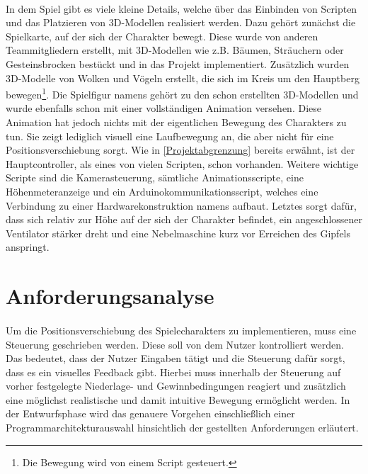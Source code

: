 \paragraph{}
In dem Spiel gibt es viele kleine Details, welche über das Einbinden von Scripten und das Platzieren von 3D-Modellen realisiert werden. Dazu gehört zunächst die Spielkarte, auf der sich der Charakter bewegt. Diese wurde von anderen Teammitgliedern erstellt, mit 3D-Modellen wie z.B. Bäumen, Sträuchern oder Gesteinsbrocken bestückt und in das Projekt implementiert. Zusätzlich wurden 3D-Modelle von Wolken und Vögeln erstellt, die sich im Kreis um den Hauptberg bewegen\footnote{Die Bewegung wird von einem Script gesteuert.}.
Die Spielfigur namens  gehört zu den schon erstellten 3D-Modellen und wurde ebenfalls schon mit einer vollständigen Animation versehen. Diese Animation hat jedoch nichts mit der eigentlichen Bewegung des Charakters zu tun. Sie zeigt lediglich visuell eine Laufbewegung an, die aber nicht für eine Positionsverschiebung sorgt. 
Wie in \autoref{Projektabgrenzung}  bereits erwähnt, ist der Hauptcontroller, als eines von vielen Scripten, schon vorhanden. Weitere wichtige Scripte sind die Kamerasteuerung, sämtliche Animationsscripte, eine Höhenmeteranzeige und ein Arduinokommunikationsscript, welches eine Verbindung zu einer Hardwarekonstruktion namens  aufbaut. Letztes sorgt dafür, dass sich relativ zur Höhe auf der sich der Charakter befindet, ein angeschlossener Ventilator stärker dreht und eine Nebelmaschine kurz vor Erreichen des Gipfels anspringt.

\section{Anforderungsanalyse}
\paragraph{}
Um die Positionsverschiebung des Spielecharakters zu implementieren, muss eine Steuerung geschrieben werden. Diese soll von dem Nutzer kontrolliert werden. Das bedeutet, dass der Nutzer Eingaben tätigt und die Steuerung dafür sorgt, dass es ein visuelles Feedback gibt. Hierbei muss innerhalb der Steuerung auf vorher festgelegte Niederlage- und Gewinnbedingungen reagiert und zusätzlich eine möglichst realistische und damit intuitive Bewegung ermöglicht werden. In der Entwurfsphase wird das genauere Vorgehen einschließlich einer Programmarchitekturauswahl hinsichtlich der gestellten Anforderungen erläutert.

